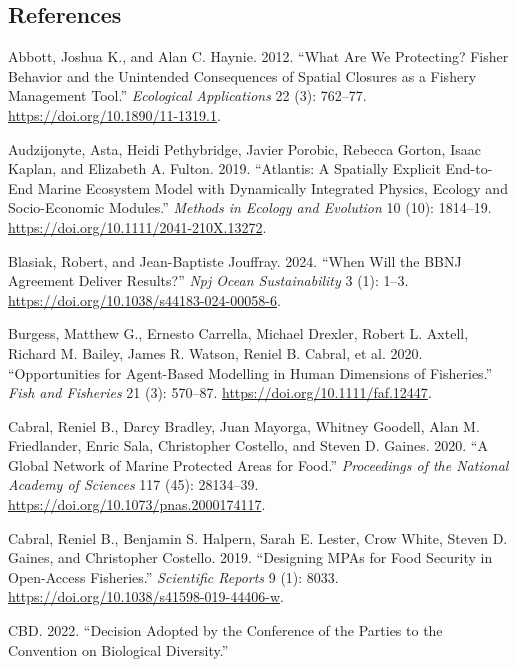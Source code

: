 \documentclass[
  default,
  lineno,
  referee]{sn-jnl}
\newlength{\cslhangindent}
\newenvironment{CSLReferences}[2] %
 {\begin{list}{}{%
  \setlength{\itemindent}{0pt}
  \setlength{\leftmargin}{0pt}
  \setlength{\parsep}{0pt}
  \ifodd #1
   \setlength{\leftmargin}{\cslhangindent}
   \setlength{\itemindent}{-1\cslhangindent}
  \fi
  \setlength{\itemsep}{#2\baselineskip}}}
 {\end{list}}
\begin{document}
\subsection{References}\label{references}

\label{refs}
\begin{CSLReferences}{1}{0}
Abbott, Joshua K., and Alan C. Haynie. 2012. {``What Are We Protecting?
Fisher Behavior and the Unintended Consequences of Spatial Closures as a
Fishery Management Tool.''} \emph{Ecological Applications} 22 (3):
762--77. \url{https://doi.org/10.1890/11-1319.1}.

Audzijonyte, Asta, Heidi Pethybridge, Javier Porobic, Rebecca Gorton,
Isaac Kaplan, and Elizabeth A. Fulton. 2019. {``Atlantis: A Spatially
Explicit End-to-End Marine Ecosystem Model with Dynamically Integrated
Physics, Ecology and Socio-Economic Modules.''} \emph{Methods in Ecology
and Evolution} 10 (10): 1814--19.
\url{https://doi.org/10.1111/2041-210X.13272}.

Blasiak, Robert, and Jean-Baptiste Jouffray. 2024. {``When Will the BBNJ
Agreement Deliver Results?''} \emph{Npj Ocean Sustainability} 3 (1):
1--3. \url{https://doi.org/10.1038/s44183-024-00058-6}.

Burgess, Matthew G., Ernesto Carrella, Michael Drexler, Robert L.
Axtell, Richard M. Bailey, James R. Watson, Reniel B. Cabral, et al.
2020. {``Opportunities for Agent-Based Modelling in Human Dimensions of
Fisheries.''} \emph{Fish and Fisheries} 21 (3): 570--87.
\url{https://doi.org/10.1111/faf.12447}.

Cabral, Reniel B., Darcy Bradley, Juan Mayorga, Whitney Goodell, Alan M.
Friedlander, Enric Sala, Christopher Costello, and Steven D. Gaines.
2020. {``A Global Network of Marine Protected Areas for Food.''}
\emph{Proceedings of the National Academy of Sciences} 117 (45):
28134--39. \url{https://doi.org/10.1073/pnas.2000174117}.

Cabral, Reniel B., Benjamin S. Halpern, Sarah E. Lester, Crow White,
Steven D. Gaines, and Christopher Costello. 2019. {``Designing MPAs for
Food Security in Open-Access Fisheries.''} \emph{Scientific Reports} 9
(1): 8033. \url{https://doi.org/10.1038/s41598-019-44406-w}.

CBD. 2022. {``Decision Adopted by the Conference of the Parties to the
Convention on Biological Diversity.''}


\end{CSLReferences}
\end{document}
